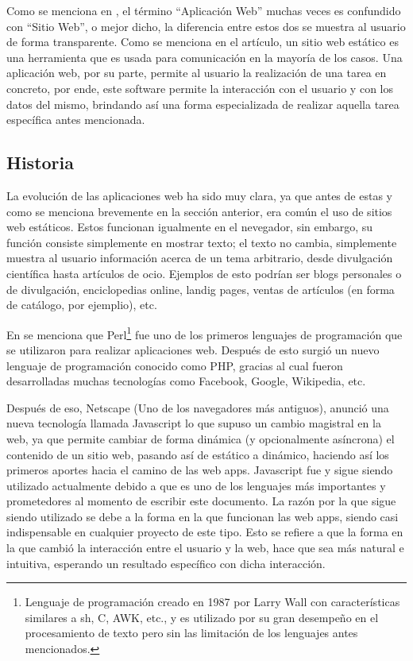 \documentclass{article}
\begin{document}
Como se menciona en \cite{um}, el término ``Aplicación Web'' muchas veces es
confundido con ``Sitio Web'', o mejor dicho, la diferencia entre estos dos
se muestra al usuario de forma transparente. Como se menciona en el artículo,
un sitio web estático es una herramienta que es usada para comunicación en la
mayoría de los casos. Una aplicación web, por su parte, permite al usuario la
realización de una tarea en concreto, por ende, este software permite la
interacción con el usuario y con los datos del mismo, brindando así una forma
especializada de realizar aquella tarea específica antes mencionada.

\subsection{Historia}
La evolución de las aplicaciones web ha sido muy clara, ya que antes de estas y
como se menciona brevemente en la sección anterior, era común el uso de sitios
web estáticos. Estos funcionan igualmente en el nevegador, sin embargo, su función
consiste simplemente en mostrar texto; el texto no cambia, simplemente muestra
al usuario información acerca de un tema arbitrario, desde divulgación
científica hasta artículos de ocio. Ejemplos de esto podrían ser blogs personales
o de divulgación, enciclopedias online, landig pages, ventas de artículos
(en forma de catálogo, por ejemplio), etc.

En \cite{um} se menciona que Perl\footnote{Lenguaje de programación creado en
1987 por Larry Wall con características similares a sh, C, AWK, etc., y es
utilizado por su gran desempeño en el procesamiento de texto pero sin las
limitación de los lenguajes antes mencionados\cite{wiki_perl}.} fue uno de los primeros
lenguajes de programación que se utilizaron para realizar aplicaciones web.
Después de esto surgió un nuevo lenguaje de programación conocido como PHP,
gracias al cual fueron desarrolladas muchas tecnologías como Facebook, Google,
Wikipedia, etc.

Después de eso, Netscape (Uno de los navegadores más antiguos), anunció una
nueva tecnología llamada Javascript lo que supuso un cambio magistral en la web,
ya que permite cambiar de forma dinámica (y opcionalmente asíncrona) el
contenido de un sitio web, pasando así de estático a dinámico, haciendo así los
primeros aportes hacia el camino de las web apps.
Javascript fue y sigue siendo utilizado actualmente debido a que es uno de los
lenguajes más importantes y prometedores al momento de escribir este documento.
La razón por la que sigue siendo utilizado se debe a la forma en la que
funcionan las web apps, siendo casi indispensable en cualquier proyecto de este
tipo. Esto se refiere a que la forma en la que cambió la interacción entre el
usuario y la web,  hace que sea más natural e intuitiva, esperando un resultado
específico con dicha interacción.
\end{document}
